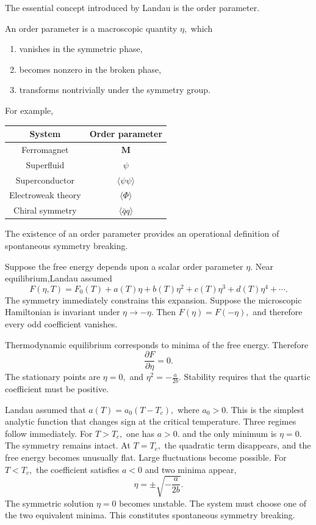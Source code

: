 The essential concept introduced by Landau is the order parameter.
\begin{definition}
An order parameter is a macroscopic quantity $\eta,$ which
\begin{enumerate}
\item vanishes in the symmetric phase,
\item becomes nonzero in the broken phase,
\item transforms nontrivially under the symmetry group.
\end{enumerate}
\end{definition}
For example,
\begin{center}
\begin{tabular}{cc}
System & Order parameter \\
\hline
Ferromagnet & $\mathbf M$\\
Superfluid & $\psi$\\
Superconductor & $\langle\psi\psi\rangle$\\
Electroweak theory & $\langle\Phi\rangle$\\
Chiral symmetry & $\langle\bar qq\rangle$
\end{tabular}
\end{center}
The existence of an order parameter provides an operational definition
of spontaneous symmetry breaking.

Suppose the free energy depends upon a scalar order parameter $\eta.$
Near equilibrium,Landau assumed
\[F(\eta,T)=F_0(T)+a(T)\eta+b(T)\eta^2+c(T)\eta^3+d(T)\eta^4+\cdots.\]
The symmetry immediately constrains this expansion.
Suppose the microscopic Hamiltonian is invariant under
$\eta \rightarrow -\eta.$ Then $F(\eta)=F(-\eta),$
and therefore every odd coefficient vanishes.

Thermodynamic equilibrium corresponds to minima of the free energy.
Therefore
\[\frac{\partial F}{\partial\eta}=0.\]
The stationary points are $\eta=0,$ and $\eta^2=-\frac{a}{2b}.$
Stability requires that the quartic coefficient must be positive.

Landau assumed that $a(T)=a_0(T-T_c),$ where $a_0>0.$
This is the simplest analytic function that changes sign at the critical
temperature.
Three regimes follow immediately.
For $T>T_c,$ one has $a>0.$ and the only minimum is $\eta=0.$
The symmetry remains intact.
At $T=T_c,$ the quadratic term disappears, and
the free energy becomes unusually flat.
Large fluctuations become possible.
For $T<T_c,$ the coefficient satisfies $a<0 $ and two minima appear,
\[\eta=\pm\sqrt{-\frac{a}{2b}}.\]
The symmetric solution $\eta=0$ becomes unstable.
The system must choose one of the two equivalent minima.
This constitutes spontaneous symmetry breaking.

